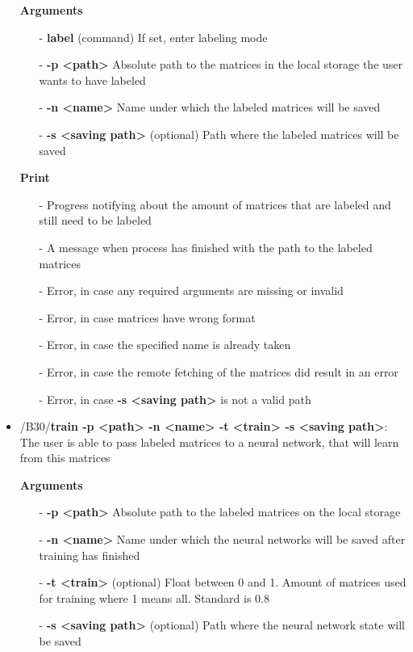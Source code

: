 \documentclass[parskip=full]{scrartcl}
\begin{document}
\begin{itemize}
\textbf{Arguments}
	\begin{itemize}
	\item[-]\textbf{label} (command) If set, enter labeling mode
	\item[-]\textbf{-p <path>} Absolute path to the matrices in the local storage the user wants to have labeled
	\item[-]\textbf{-n <name>} Name under which the labeled matrices will be saved
	\item[-]\textbf{-s <saving path>} (optional) Path where the labeled matrices will be saved
	\end{itemize}

\textbf{Print}
	\begin{itemize}
	\item[-]Progress notifying about the amount of matrices that are labeled and still need to be labeled
	\item[-]A message when process has finished with the path to the labeled matrices
	\item[-]Error, in case any required arguments are missing or invalid
	\item[-]Error, in case matrices have wrong format
	\item[-]Error, in case the specified name is already taken
	\item[-]Error, in case the remote fetching of the matrices did result in an error
	\item[-]Error, in case \textbf{-s <saving path>} is not a valid path
	\end{itemize}

\item/B30/\textbf{train -p <path> -n <name> -t <train> -s <saving path>}:
\newline The user is able to pass labeled matrices to a \gls{neural network}, that will learn from this matrices

\textbf{Arguments}
	\begin{itemize}
	\item[-]\textbf{-p <path>} Absolute path to the labeled matrices on the local storage
	\item[-]\textbf{-n <name>} Name under which the \glspl{neural network} will be saved after training has finished
	\item[-]\textbf{-t <train>} (optional) Float between 0 and 1. Amount of matrices used for training where 1 means all. Standard is 0.8
	\item[-]\textbf{-s <saving path>} (optional) Path where the \gls{neural network} state will be saved
	\end{itemize}


\end{itemize}
\end{document}
